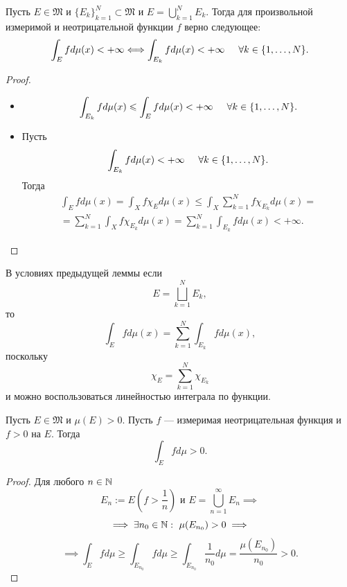 \begin{lemma}
    Пусть $E \in \mathfrak{M}$ и $\{E_k\}_{k=1}^N \subset \mathfrak{M}$ и $E = \bigcup\limits_{k=1}^{N}E_k$.
    Тогда для произвольной измеримой и неотрицательной функции $f$ верно следующее:
    \[\int_E f d\mu(x) < +\infty
    \Longleftrightarrow
    \int_{E_k} f d\mu(x) < +\infty \hspace*{.5cm} \forall k \in \{1, \dots, N\}.\]
\end{lemma} 
\begin{proof}\tab
    \begin{itemize}
        \item[\underline{$\implies$}]
        \[\int_{E_k} f d\mu(x) \leqslant \int_E f d\mu(x) < +\infty \hspace*{.5cm} \forall k \in \{1, \dots, N\}.\]
        \item[\underline{$\impliedby$}]
        Пусть
        \[\int_{E_k} f d\mu(x) < +\infty \hspace*{.5cm} \forall k \in \{1, \dots, N\}.\]
        Тогда
        \begin{multline*}
            \int_E f d\mu(x) = \int_X f \chi_E d\mu(x)
            \leqslant
            \int_X \sum\limits_{k=1}^{N} f \chi_{E_k} d\mu(x)
            =\\= \sum\limits_{k=1}^{N} \int_X f \chi_{E_k} d\mu(x)
            = \sum\limits_{k=1}^{N} \int_{E_k} f d\mu(x) < +\infty.
        \end{multline*} 
    \end{itemize}
\end{proof} 

\begin{remark}
    В условиях предыдущей леммы если
    \[E = \bigsqcup\limits_{k=1}^{N}E_k,\]
    то
    \[\int_E f d\mu(x) = \sum\limits_{k=1}^{N} \int_{E_k} f d\mu(x),\]
    поскольку
    \[\chi_E = \sum\limits_{k=1}^{N} \chi_{E_k}\]
    и можно воспользоваться линейностью интеграла по функции.
\end{remark}

\begin{lemma}
    Пусть $E \in \mathfrak{M}$ и $\mu(E) > 0$.
    Пусть $f$ — измеримая неотрицательная функция и $f>0$ на $E$.
    Тогда
    \[\int_E f d\mu > 0.\]
\end{lemma} 
\begin{proof}
    Для любого $n \in \mathbb{N}$
    \[E_n := E\left(f > \frac{1}{n}\right) \text{ и } E = \bigcup\limits_{n=1}^{\infty} E_n \implies\]
    \[\implies \exists n_0 \in \mathbb{N}: \ \mu(E_{n_0}) > 0 \implies\]
    \[\implies \int_E f d\mu \geqslant \int_{E_{n_{0}}} f d\mu
    \geqslant \int_{E_{n_0}} \frac{1}{n_0} d\mu = \frac{\mu(E_{n_0})}{n_0} > 0. \]
\end{proof} 


